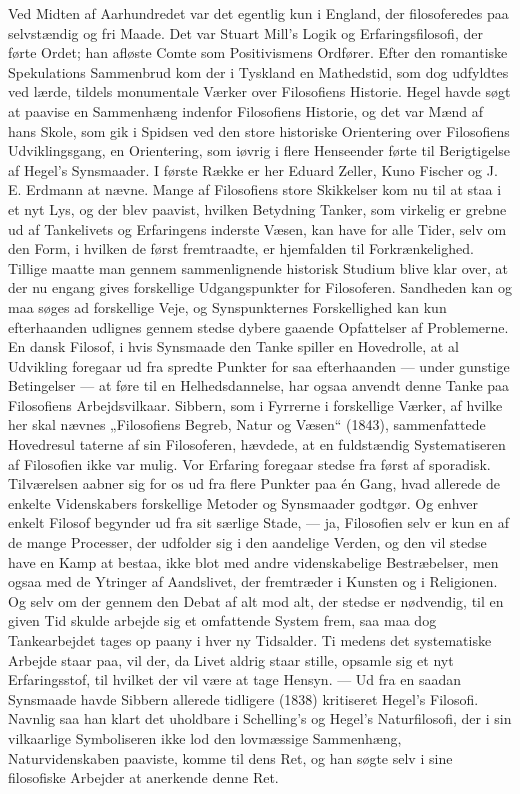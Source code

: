 \documentclass[12pt,a4paper,openany]{book}
\newcommand{\opage}[1]{\marginnote{\footnotesize\textit{[#1]}}}
\begin{document}
Ved Midten af Aarhundredet var det egentlig kun i England, der
filosoferedes paa selvstændig og fri Maade. Det var Stuart Mill’s Logik
og Erfaringsfilosofi, der førte Ordet; han afløste Comte som Positivismens
Ordfører. Efter den romantiske Spekulations Sammenbrud
kom der i Tyskland en Mathedstid, som dog udfyldtes ved
lærde, tildels monumentale Værker over Filosofiens Historie. Hegel
havde søgt at paavise en Sammenhæng indenfor Filosofiens Historie,
og det var Mænd af hans Skole, som gik i Spidsen ved den store historiske
Orientering over Filosofiens Udviklingsgang, en Orientering,
som iøvrig i flere Henseender førte til Berigtigelse af Hegel’s Synsmaader.
I første Række er her Eduard Zeller, Kuno Fischer og
J. E. Erdmann at nævne. Mange af Filosofiens store Skikkelser
kom nu til at staa i et nyt Lys, og der blev paavist, hvilken Betydning
Tanker, som virkelig er grebne ud af Tankelivets og Erfaringens
inderste Væsen, kan have for alle Tider, selv om den Form, i
hvilken de først fremtraadte, er hjemfalden til Forkrænkelighed.
Tillige maatte man gennem sammenlignende historisk Studium blive
klar over, at der nu engang gives forskellige Udgangspunkter for Filosoferen.
Sandheden kan og maa søges ad forskellige Veje, og Synspunkternes
Forskellighed kan kun efterhaanden udlignes gennem
stedse dybere gaaende Opfattelser af Problemerne. En dansk Filosof,
i hvis Synsmaade den Tanke spiller en Hovedrolle, at al Udvikling
foregaar ud fra spredte Punkter for saa efterhaanden --- under
gunstige Betingelser --- at føre til en Helhedsdannelse, har ogsaa
anvendt denne Tanke paa Filosofiens Arbejdsvilkaar. Sibbern, som
i Fyrrerne i forskellige Værker, af hvilke her skal nævnes „Filosofiens
Begreb, Natur og Væsen“ (1843), sammenfattede Hovedresul%
\opage{63}taterne af sin Filosoferen, hævdede, at en fuldstændig Systematiseren
af Filosofien ikke var mulig. Vor Erfaring foregaar stedse fra
først af sporadisk. Tilværelsen aabner sig for os ud fra flere Punkter
paa én Gang, hvad allerede de enkelte Videnskabers forskellige
Metoder og Synsmaader godtgør. Og enhver enkelt Filosof begynder
ud fra sit særlige Stade, --- ja, Filosofien selv er kun en af de mange
Processer, der udfolder sig i den aandelige Verden, og den vil stedse
have en Kamp at bestaa, ikke blot med andre videnskabelige Bestræbelser,
men ogsaa med de Ytringer af Aandslivet, der fremtræder
i Kunsten og i Religionen. Og selv om der gennem den Debat
af alt mod alt, der stedse er nødvendig, til en given Tid skulde arbejde
sig et omfattende System frem, saa maa dog Tankearbejdet
tages op paany i hver ny Tidsalder. Ti medens det systematiske
Arbejde staar paa, vil der, da Livet aldrig staar stille, opsamle sig
et nyt Erfaringsstof, til hvilket der vil være at tage Hensyn. --- Ud
fra en saadan Synsmaade havde Sibbern allerede tidligere (1838)
kritiseret Hegel’s Filosofi. Navnlig saa han klart det uholdbare i
Schelling’s og Hegel’s Naturfilosofi, der i sin vilkaarlige Symboliseren
ikke lod den lovmæssige Sammenhæng, Naturvidenskaben paaviste,
komme til dens Ret, og han søgte selv i sine filosofiske Arbejder at
anerkende denne Ret.
\end{document}
